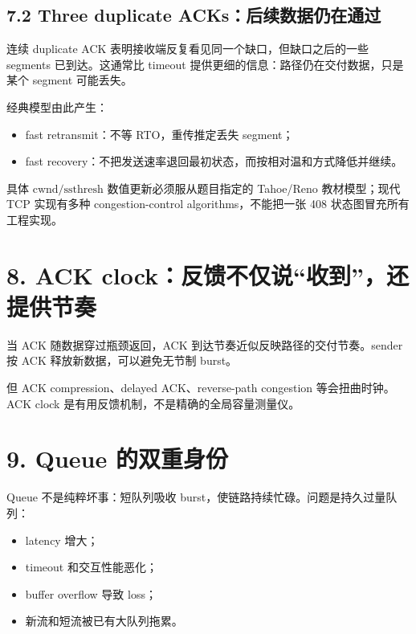 \documentclass[UTF8,fontset=none,11pt,a4paper]{ctexart}
\providecommand{\tightlist}{\setlength{\itemsep}{0pt}\setlength{\parskip}{0pt}}
\begin{document}
\subsection{7.2 Three duplicate
ACKs：后续数据仍在通过}\label{72-three-duplicate-acksux540eux7eedux6570ux636eux4ecdux5728ux901aux8fc7}

连续 duplicate ACK 表明接收端反复看见同一个缺口，但缺口之后的一些
segments 已到达。这通常比 timeout
提供更细的信息：路径仍在交付数据，只是某个 segment 可能丢失。

经典模型由此产生：

\begin{itemize}
\tightlist
\item
  fast retransmit：不等 RTO，重传推定丢失 segment；
\item
  fast recovery：不把发送速率退回最初状态，而按相对温和方式降低并继续。
\end{itemize}

具体 \(\text{cwnd}/\text{ssthresh}\) 数值更新必须服从题目指定的
Tahoe/Reno 教材模型；现代 TCP 实现有多种 congestion-control
algorithms，不能把一张 408 状态图冒充所有工程实现。

\section{8. ACK
clock：反馈不仅说``收到''，还提供节奏}\label{8-ack-clockux53cdux9988ux4e0dux4ec5ux8bf4ux6536ux5230ux8fd8ux63d0ux4f9bux8282ux594f}

当 ACK 随数据穿过瓶颈返回，ACK 到达节奏近似反映路径的交付节奏。sender 按
ACK 释放新数据，可以避免无节制 burst。

但 ACK compression、delayed ACK、reverse-path congestion
等会扭曲时钟。ACK clock 是有用反馈机制，不是精确的全局容量测量仪。

\section{9. Queue
的双重身份}\label{9-queue-ux7684ux53ccux91cdux8eabux4efd}

Queue 不是纯粹坏事：短队列吸收
burst，使链路持续忙碌。问题是持久过量队列：

\begin{itemize}
\tightlist
\item
  latency 增大；
\item
  timeout 和交互性能恶化；
\item
  buffer overflow 导致 loss；
\item
  新流和短流被已有大队列拖累。
\end{itemize}
\end{document}
